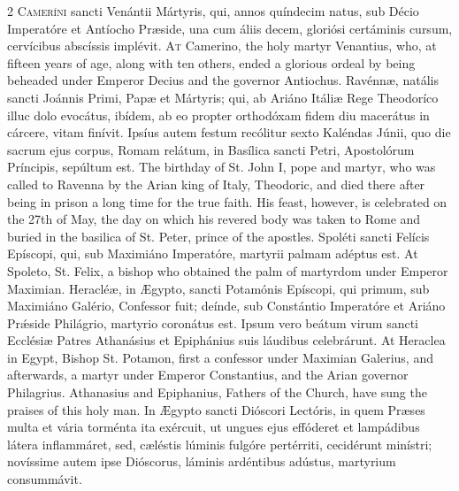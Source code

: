 \begin{paracol}{2}
\lettrine[lines=2]{C}{ameríni} sancti 
 Venántii Mártyris, qui, annos quíndecim natus, sub Décio Imperatóre et 
 Antíocho Præside, una cum áliis decem, gloriósi certáminis cursum, 
 cervícibus abscíssis implévit.
\switchcolumn
{}
\lettrine[lines=2]{A}{t} Camerino, the holy martyr Venantius, who, at fifteen years of age, along with ten others, ended a 
 glorious ordeal by being beheaded under Emperor Decius and the governor 
 Antiochus.
\switchcolumn*
{}
Ravénnæ, natális 
 sancti Joánnis Primi, Papæ et Mártyris; qui, ab Ariáno Itáliæ Rege 
 Theodoríco illuc dolo evocátus, ibídem, ab eo propter orthodóxam fidem diu 
 macerátus in cárcere, vitam finívit. Ipsíus autem festum recólitur 
 sexto Kaléndas Júnii, quo die sacrum ejus corpus, Romam relátum, in Basílica sancti Petri, Apostolórum Príncipis, sepúltum est.
\switchcolumn
{}
The birthday of St. John I, pope 
 and martyr, who was called to Ravenna by the Arian king of Italy, Theodoric, 
 and died there after being in prison a long time for the true faith. 
 His feast, however, is celebrated on the 27th of May, the day on which his 
 revered body was taken to Rome and buried in the basilica of St. Peter, 
 prince of the apostles.
\switchcolumn*
{}
Spoléti sancti 
 Felícis Epíscopi, qui, sub Maximiáno Imperatóre, martyrii palmam adéptus 
 est.
\switchcolumn
{}
At Spoleto, St. Felix, a bishop who 
 obtained the palm of martyrdom under Emperor Maximian.
\switchcolumn*
{}
Heracléæ, in Ægypto, 
 sancti Potamónis Epíscopi, qui primum, sub Maximiáno Galério, Confessor fuit; 
 deínde, sub Constántio Imperatóre et Ariáno Prǽside Philágrio, martyrio 
 coronátus est. Ipsum vero beátum virum sancti Ecclésiæ Patres 
 Athanásius et Epiphánius suis láudibus celebrárunt.
\switchcolumn
{}
At Heraclea in Egypt, Bishop St. 
 Potamon, first a confessor under Maximian Galerius, and afterwards, a martyr 
 under Emperor Constantius, and the Arian governor Philagrius. 
 Athanasius and Epiphanius, Fathers of the Church, have sung the praises of 
 this holy man.
\switchcolumn*
{}
In Ægypto sancti 
 Dióscori Lectóris, in quem Præses multa et vária torménta ita exércuit, ut 
 ungues ejus effóderet et lampádibus látera inflammáret, sed, cæléstis 
 lúminis fulgóre pertérriti, cecidérunt minístri; novíssime autem ipse 
 Dióscorus, láminis ardéntibus adústus, martyrium consummávit.
\switchcolumn

\end{paracol}
